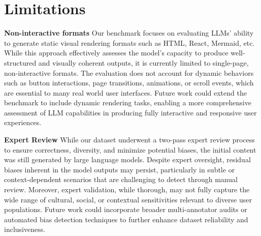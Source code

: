 \section*{Limitations}
\label{sec:limitations}
\textbf{Non-interactive formats} Our benchmark focuses on evaluating LLMs’ ability to generate static visual rendering formats such as HTML, React, Mermaid, etc. While this approach effectively assesses the model’s capacity to produce well-structured and visually coherent outputs, it is currently limited to single-page, non-interactive formats. The evaluation does not account for dynamic behaviors such as button interactions, page transitions, animations, or scroll events, which are essential to many real world user interfaces. Future work could extend the benchmark to include dynamic rendering tasks, enabling a more comprehensive assessment of LLM capabilities in producing fully interactive and responsive user experiences.

\textbf{Expert Review} While our dataset underwent a two-pass expert review process to ensure correctness, diversity, and minimize potential biases, the initial content was still generated by large language models. Despite expert oversight, residual biases inherent in the model outputs may persist, particularly in subtle or context-dependent scenarios that are challenging to detect through manual review. Moreover, expert validation, while thorough, may not fully capture the wide range of cultural, social, or contextual sensitivities relevant to diverse user populations. Future work could incorporate broader multi-annotator audits or automated bias detection techniques to further enhance dataset reliability and inclusiveness.

